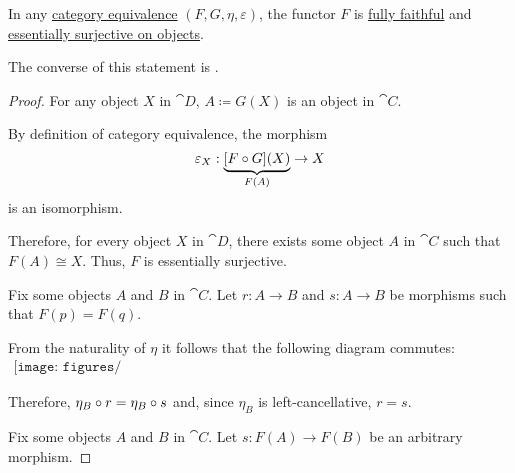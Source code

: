 \begin{proposition}\label{thm:equivalence_induces_fully_faithful_and_essentially_surjective_functor}
  In any \hyperref[def:category_equivalence]{category equivalence} \( (F, G, \eta, \varepsilon) \), the functor \( F \) is \hyperref[def:functor_invertibility/fully_faithful]{fully faithful} and \hyperref[def:functor_invertibility/surjective_on_objects]{essentially surjective on objects}.

  The converse of this statement is .
\end{proposition}
\begin{proof}
   For any object \( X \) in \( \cat{D} \), \( A \coloneqq G(X) \) is an object in \( \cat{C} \).

  By definition of category equivalence, the morphism
  \begin{equation*}
    \varepsilon_X: \underbrace{[F \bincirc G](X)}_{F(A)} \to X
  \end{equation*}
  is an isomorphism.

  Therefore, for every object \( X \) in \( \cat{D} \), there exists some object \( A \) in \( \cat{C} \) such that \( F(A) \cong X \). Thus, \( F \) is essentially surjective.

   Fix some objects \( A \) and \( B \) in \( \cat{C} \). Let \( r: A \to B \) and \( s: A \to B \) be morphisms such that \( F(p) = F(q) \).

  From the naturality of \( \eta \) it follows that the following diagram commutes:
  \begin{equation}\label{eq:thm:equivalence_induces_fully_faithful_and_essentially_surjective_functor/faithfullness}
    \begin{aligned}
      \texttt{[image: figures/thm\_\_category\_equivalence\_is\_fully\_faithful\_and\_essentially\_surjective.pdf]}
    \end{aligned}
  \end{equation}

  Therefore, \( \eta_B \bincirc r = \eta_B \bincirc s \) and, since \( \eta_B \) is left-cancellative, \( r = s \).

   Fix some objects \( A \) and \( B \) in \( \cat{C} \). Let \( s: F(A) \to F(B) \) be an arbitrary morphism.


\end{proof}
